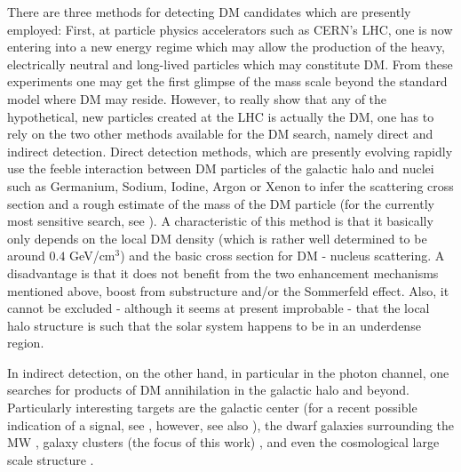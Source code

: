 \documentclass[10pt,aps,pra,reprint,amsmath,amsfonts,amssymb,showpacs,nofootinbib,floatfix]{revtex4-1}
\begin{document}
There are three methods for detecting DM candidates which are
presently employed: First, at particle physics accelerators such as
CERN's LHC, one is now entering into a new energy regime which may
allow the production of the heavy, electrically neutral and long-lived
particles which may constitute DM. From these experiments one may get
the first glimpse of the mass scale beyond the standard model where DM
may reside. However, to really show that any of the hypothetical, new
particles created at the LHC is actually the DM, one has to rely on
the two other methods available for the DM search, namely direct and
indirect detection. Direct detection methods, which are presently
evolving rapidly use the feeble interaction between DM particles of
the galactic halo and nuclei such as Germanium, Sodium, Iodine, Argon
or Xenon to infer the scattering cross section and a rough estimate of
the mass of the DM particle (for the currently most sensitive search,
see \cite{Aprile:2010um,Aprile:2011ts}). A characteristic of this method is that it
basically only depends on the local DM density (which is rather well
determined to be around $0.4$ GeV/cm$^3$) and the basic cross section
for DM - nucleus scattering. A disadvantage is that it does not benefit
from the two enhancement mechanisms mentioned above, boost from
substructure and/or the Sommerfeld effect. Also, it cannot be excluded
- although it seems at present improbable - that the local halo
structure is such that the solar system happens to be in an underdense
region.

In indirect detection, on the other hand, in particular in the photon
channel, one searches for products of DM annihilation in the galactic
halo and beyond. Particularly interesting targets are the galactic
center (for a recent possible indication of a signal, see
\cite{2010arXiv1010.2752H}, however, see also \cite{2010arXiv1012.5839B}), the dwarf galaxies surrounding the MW
\cite{Strigari:2006rd,Essig:2009jx,2010JCAP...01..031S}, galaxy
clusters (the focus of this work)
\cite{Ghigna:1998vn,Lewis:2002mfa,Boyarsky:2006kc,2006A&A...455...21C,2009PhRvL.103r1302P},
and even the cosmological large scale structure
\cite{Bergstrom:2001jj,Ullio:2002pj,Taylor:2002zd,Elsaesser:2004ap,2011MNRAS.tmp..503C,Abazajian:2010sq,Abdo:2010dk,Zavala:2011tt}.
\end{document}
